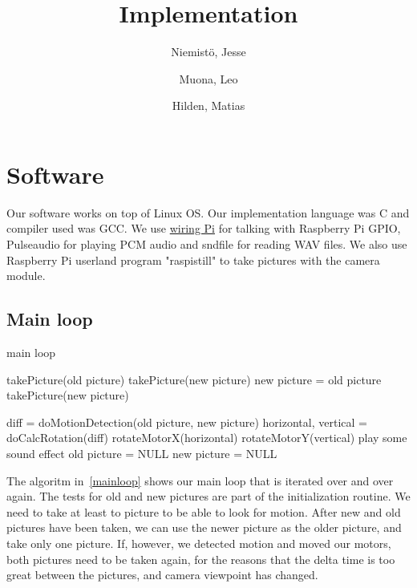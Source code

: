 \documentclass[english,11pt,twoside,a4paper]{article}
\begin{document}
\author{
  Niemistö, Jesse
  \and
  Muona, Leo
  \and
  Hilden, Matias
}
\title{Implementation}

\maketitle

\section{Software}

Our software works on top of Linux OS. Our implementation language was C and compiler used was GCC. We use \href{https://projects.drogon.net/raspberry-pi/wiringpi/}{wiring Pi} for talking with Raspberry Pi GPIO, Pulseaudio for playing PCM audio and sndfile for reading WAV files. We also use Raspberry Pi userland program "raspistill" to take pictures with the camera module.

\subsection{Main loop}

\begin{algorithm}
  \label{mainloop}
  \caption{main loop}
  \begin{algorithmic}
      \STATE takePicture(old picture)
      \STATE takePicture(new picture)
    \ELSE
      \STATE new picture = old picture
      \STATE takePicture(new picture)
    \ENDIF

      \STATE diff = doMotionDetection(old picture, new picture)
        \STATE horizontal, vertical = doCalcRotation(diff)
        \STATE rotateMotorX(horizontal)
        \STATE rotateMotorY(vertical)
          \STATE play some sound effect
        \ENDIF
	\STATE old picture = NULL
	\STATE new picture = NULL
      \ENDIF
    \ENDIF
  \end{algorithmic}
\end{algorithm}

The algoritm in~\ref{mainloop} shows our main loop that is iterated over and over again. The tests for old and new pictures are part of the initialization routine. We need to take at least to picture to be able to look for motion. After new and old pictures have been taken, we can use the newer picture as the older picture, and take only one picture. If, however, we detected motion and moved our motors, both pictures need to be taken again, for the reasons that the delta time is too great between the pictures, and camera viewpoint has changed.
\end{document}
